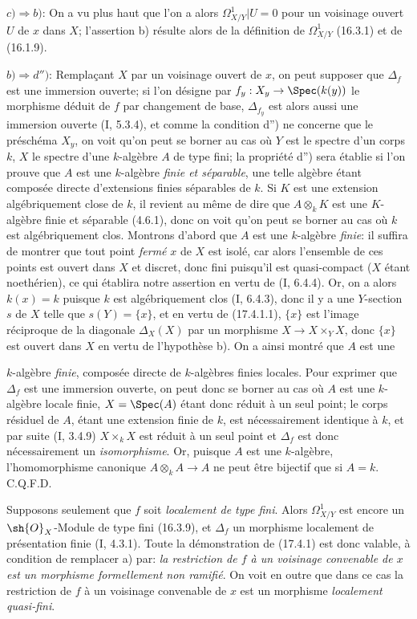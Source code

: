 $c)\Rightarrow b)$: On a vu plus haut que l'on a alors $\Omega^1_{X/Y}|U=0$ pour un voisinage ouvert $U$ de $x$ dans $X$; l'assertion b) résulte alors de la définition de $\Omega^1_{X/Y}$ (16.3.1) et de (16.1.9).

$b)\Rightarrow d'')$: Remplaçant $X$ par un voisinage ouvert de $x$, on peut supposer que $\Delta_f$ est une immersion ouverte; si l'on désigne par $f_y:X_y\to\Spec(k(y))$ le morphisme déduit de $f$ par changement de base, $\Delta_{f_y}$ est alors aussi une immersion ouverte (I, 5.3.4), et comme la condition d'') ne concerne que le préschéma $X_y$, on voit qu'on peut se borner au cas où $Y$ est le spectre d'un corps $k$, $X$ le spectre d'une $k$-algèbre $A$ de type fini; la propriété d'') sera établie si l'on prouve que $A$ est une $k$-algèbre \emph{finie et séparable}, une telle algèbre étant composée directe d'extensions finies séparables de $k$. Si $K$ est une extension algébriquement close de $k$, il revient au même de dire que $A\otimes_k K$ est une $K$-algèbre finie et séparable (4.6.1), donc on voit qu'on peut se borner au cas où $k$ est algébriquement clos. Montrons d'abord que $A$ est une $k$-algèbre \emph{finie}: il suffira de montrer que tout point \emph{fermé} $x$ de $X$ est isolé, car alors l'ensemble de ces points est ouvert dans $X$ et discret, donc fini puisqu'il est quasi-compact ($X$ étant noethérien), ce qui établira notre assertion en vertu de (I, 6.4.4). Or, on a alors $k(x)=k$ puisque $k$ est algébriquement clos (I, 6.4.3), donc il y a une $Y$-section $s$ de $X$ telle que $s(Y)=\{x\}$, et en vertu de (17.4.1.1), $\{x\}$ est l'image réciproque de la diagonale $\Delta_X(X)$ par un morphisme $X\to X\times_Y X$, donc $\{x\}$ est ouvert dans $X$ en vertu de l'hypothèse b). On a ainsi montré que $A$ est une

$k$-algèbre \emph{finie}, composée directe de $k$-algèbres finies locales. Pour exprimer que $\Delta_f$ est une immersion ouverte, on peut donc se borner au cas où $A$ est une $k$-algèbre locale finie, $X=\Spec(A)$ étant donc réduit à un seul point; le corps résiduel de $A$, étant une extension finie de $k$, est nécessairement identique à $k$, et par suite (I, 3.4.9) $X\times_k X$ est réduit à un seul point et $\Delta_f$ est donc nécessairement un \emph{isomorphisme}. Or, puisque $A$ est une $k$-algèbre, l'homomorphisme canonique $A\otimes_k A\to A$ ne peut être bijectif que si $A=k$. C.Q.F.D.

\begin{remark}[17.4.1.2]
\label{IV.17.4.1.2}
Supposons seulement que $f$ soit \emph{localement de type fini}. Alors $\Omega^1_{X/Y}$ est encore un $\sh{O}_X$-Module de type fini (16.3.9), et $\Delta_f$ un morphisme localement de présentation finie (I, 4.3.1). Toute la démonstration de (17.4.1) est donc valable, à condition de remplacer a) par: \emph{la restriction de $f$ à un voisinage convenable de $x$ est un morphisme formellement non ramifié}. On voit en outre que dans ce cas la restriction de $f$ à un voisinage convenable de $x$ est un morphisme \emph{localement quasi-fini}.
\end{remark}

